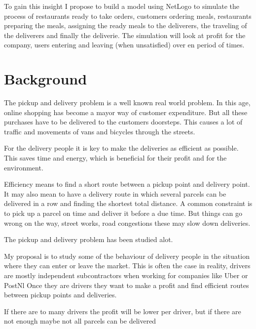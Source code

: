 To gain this insight I propose to build a model using NetLogo to simulate the process of restaurants ready to take orders, customers ordering meals,
restaurants preparing the meals, assigning the ready meals to the deliverers, the traveling of the deliverers and finally the deliverie.
The simulation will look at profit for the company, users entering and leaving (when unsatisfied) over en period of times.






















\section{Background}
The pickup and delivery problem is a well known real world problem.
In this age, online shopping has become a mayor way of customer expenditure.
But all these purchases have to be delivered to the customers doorsteps.
This causes a lot of traffic and movements of vans and bicycles through the streets.

For the delivery people it is key to make the deliveries as efficient as possible.
This saves time and energy, which is beneficial for their profit and for the environment.

Efficiency means to find a short route between a pickup point and delivery point.
It may also mean to have a delivery route in which several parcels can be delivered in a row and finding the shortest total distance.
A common constraint is to pick up a parcel on time and deliver it before a due time.
But things can go wrong on the way, street works, road congestions these may slow down deliveries.

The pickup and delivery problem has been studied alot.

My proposal is to study some of the behaviour of delivery people in the situation where they can enter or leave the market.
This is often the case in reality, drivers are mostly independent subcontractors when working for companies like Uber or PostNl
Once they are drivers they want to make a profit and find efficient routes between pickup points and deliveries.

If there are to many drivers the profit will be lower per driver, but if there are not enough maybe not all parcels can be delivered

